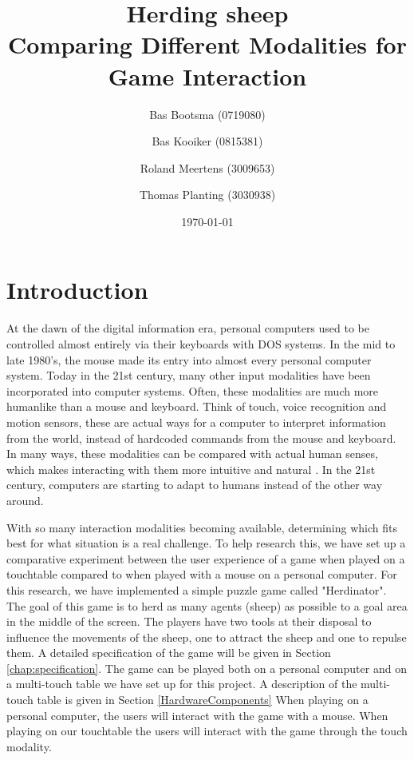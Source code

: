 \documentclass[a4paper,10pt]{report}
\begin{document}
\title{Herding sheep \\
	\large Comparing Different Modalities for Game Interaction}
\author{Bas Bootsma (0719080) \and Bas Kooiker (0815381) \and Roland Meertens (3009653) \and Thomas Planting (3030938)}
\date{\today}
\maketitle
\tableofcontents

\chapter{Introduction}
\label{chap:introduction}

At the dawn of the digital information era, personal computers used to be controlled almost entirely via their keyboards with DOS systems. 
In the mid to late 1980's, the mouse made its entry into almost every personal computer system.
Today in the 21st century, many other input modalities have been incorporated into computer systems.
Often, these modalities are much more humanlike than a mouse and keyboard. 
Think of touch, voice recognition and motion sensors, these are actual ways for a computer to interpret information from the world, instead of hardcoded commands from the mouse and keyboard. 
In many ways, these modalities can be compared with actual human senses, which makes interacting with them more intuitive and natural \cite{earnshaw2001frontiers}.
In the 21st century, computers are starting to adapt to humans instead of the other way around.

With so many interaction modalities becoming available, determining which fits best for what situation is a real challenge.
To help research this, we have set up a comparative experiment between the user experience of a game when played on a touchtable compared to when played with a mouse on a personal computer.
For this research, we have implemented a simple puzzle game called "Herdinator". 
The goal of this game is to herd as many agents (sheep) as possible to a goal area in the middle of the screen.
The players have two tools at their disposal to influence the movements of the sheep, one to attract the sheep and one to repulse them.
A detailed specification of the game will be given in Section \ref{chap:specification}.
The game can be played both on a personal computer and on a multi-touch table we have set up for this project. A description of the multi-touch table is given in Section \ref{HardwareComponents}
When playing on a personal computer, the users will interact with the game with a mouse.
When playing on our touchtable the users will interact with the game through the touch modality.
\end{document}
